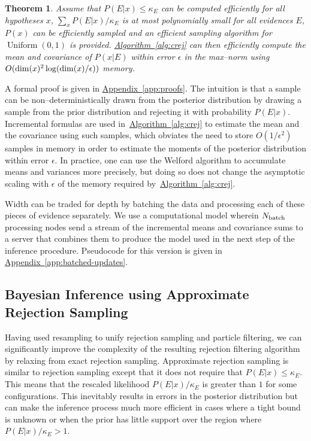 \documentclass{article} %
\newtheorem{theorem}{Theorem}
\newcommand{\app}[1]{\hyperref[app:#1]{Appendix~\ref*{app:#1}}}
\newcommand{\alg}[1]{\hyperref[alg:#1]{Algorithm~\ref*{alg:#1}}}
\begin{document}
\begin{theorem}
Assume that $P(E|x)\le \kappa_E$ can be computed efficiently for all hypotheses $x$, $\sum_x P(E|x)/\kappa_E$ is at most polynomially small for all
evidences $E$, $P(x)$ can be efficiently sampled and an efficient sampling algorithm for $\operatorname{Uniform}(0,1)$ is provided.  \alg{crej} 
can then efficiently compute the mean and covariance of $P(x|E)$ within error $\epsilon$ in the max--norm using $O({\rm dim}(x)^2\log({\rm dim}(x)/\epsilon))$ memory.\label{thm:crej}
\end{theorem}
A formal proof is given in \app{proofs}.  The intuition is that a sample can be non--deterministically drawn from
the posterior distribution by drawing a
sample from the prior distribution and rejecting it with probability $P(E|x)$.  Incremental formulas are
used in~\alg{crej} to estimate the mean and the covariance using such samples, which obviates the need
to store $O(1/\epsilon^2)$ samples in memory in order to estimate the moments of the posterior distribution within error $\epsilon$.
In practice, one can use the Welford algorithm \cite{welford_note_1962} to  accumulate means
and variances more precisely, but doing so does not change the asymptotic scaling with $\epsilon$ of the memory required by~\alg{crej}.

Width can be traded for depth by batching the data and processing each of
these pieces of evidence separately. 
We use a computational model wherein $N_{\rm batch}$ processing
nodes send a stream of the incremental means and
covariance sums to a server that combines them to produce the
model used in the next step of the inference procedure.
Pseudocode for this version  is given in \app{batched-updates}.

\subsection{Bayesian Inference using Approximate Rejection Sampling}
\label{sec:approx-rej}

Having used resampling to unify rejection sampling and particle filtering,
we can significantly improve the complexity of the resulting rejection filtering
algorithm by relaxing from exact rejection sampling.  Approximate rejection
sampling is similar to rejection sampling except
that it does not require that $P(E|x) \le \kappa_E$.  This means that the rescaled
likelihood $P(E|x)/\kappa_E$ is greater than $1$ for some
configurations.  This inevitably results in errors in the posterior distribution but can make the inference process much more efficient
in cases where a tight bound is unknown or when the prior has little support over the region where $P(E|x)/\kappa_E >1$.
\end{document}

